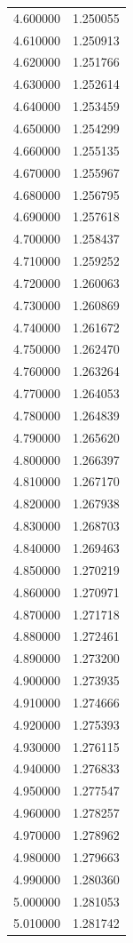 \begin{tabular}{rr}
4.600000 & 1.250055 \\
4.610000 & 1.250913 \\
4.620000 & 1.251766 \\
4.630000 & 1.252614 \\
4.640000 & 1.253459 \\
4.650000 & 1.254299 \\
4.660000 & 1.255135 \\
4.670000 & 1.255967 \\
4.680000 & 1.256795 \\
4.690000 & 1.257618 \\
4.700000 & 1.258437 \\
4.710000 & 1.259252 \\
4.720000 & 1.260063 \\
4.730000 & 1.260869 \\
4.740000 & 1.261672 \\
4.750000 & 1.262470 \\
4.760000 & 1.263264 \\
4.770000 & 1.264053 \\
4.780000 & 1.264839 \\
4.790000 & 1.265620 \\
4.800000 & 1.266397 \\
4.810000 & 1.267170 \\
4.820000 & 1.267938 \\
4.830000 & 1.268703 \\
4.840000 & 1.269463 \\
4.850000 & 1.270219 \\
4.860000 & 1.270971 \\
4.870000 & 1.271718 \\
4.880000 & 1.272461 \\
4.890000 & 1.273200 \\
4.900000 & 1.273935 \\
4.910000 & 1.274666 \\
4.920000 & 1.275393 \\
4.930000 & 1.276115 \\
4.940000 & 1.276833 \\
4.950000 & 1.277547 \\
4.960000 & 1.278257 \\
4.970000 & 1.278962 \\
4.980000 & 1.279663 \\
4.990000 & 1.280360 \\
5.000000 & 1.281053 \\
5.010000 & 1.281742 \\

\end{tabular}
